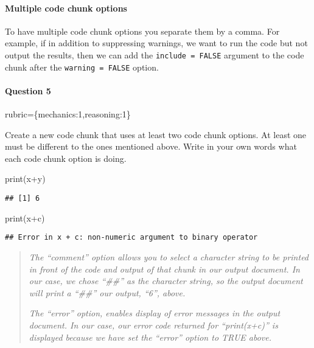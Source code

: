 \documentclass[
]{article}
\newenvironment{Shaded}{\begin{snugshade}}{\end{snugshade}}
\newcommand{\FunctionTok}[1]{\textcolor[rgb]{0.00,0.00,0.00}{#1}}
\newcommand{\NormalTok}[1]{#1}
\newcommand{\SpecialCharTok}[1]{\textcolor[rgb]{0.00,0.00,0.00}{#1}}
\begin{document}
\hypertarget{multiple-code-chunk-options}{%
\paragraph{Multiple code chunk
options}\label{multiple-code-chunk-options}}

To have multiple code chunk options you separate them by a comma. For
example, if in addition to suppressing warnings, we want to run the code
but not output the results, then we can add the
\texttt{include\ =\ FALSE} argument to the code chunk after the
\texttt{warning\ =\ FALSE} option.

\begin{alert alert-info}
\hypertarget{question-5}{%
\paragraph{Question 5}\label{question-5}}

rubric=\{mechanics:1,reasoning:1\}

Create a new code chunk that uses at least two code chunk options. At
least one must be different to the ones mentioned above. Write in your
own words what each code chunk option is doing.
\end{alert alert-info}

\begin{Shaded}
\begin{Highlighting}[]
\FunctionTok{print}\NormalTok{(x}\SpecialCharTok{+}\NormalTok{y)}
\end{Highlighting}
\end{Shaded}

\begin{verbatim}
## [1] 6
\end{verbatim}

\begin{Shaded}
\begin{Highlighting}[]
\FunctionTok{print}\NormalTok{(x}\SpecialCharTok{+}\NormalTok{c)}
\end{Highlighting}
\end{Shaded}

\begin{verbatim}
## Error in x + c: non-numeric argument to binary operator
\end{verbatim}

\begin{quote}
\emph{The ``comment'' option allows you to select a character string to
be printed in front of the code and output of that chunk in our output
document. In our case, we chose ``\#\#'' as the character string, so the
output document will print a ``\#\#'' our output, ``6'', above.}

\emph{The ``error'' option, enables display of error messages in the
output document. In our case, our error code returned for ``print(x+c)''
is displayed because we have set the ``error'' option to TRUE above.}
\end{quote}
\end{document}
